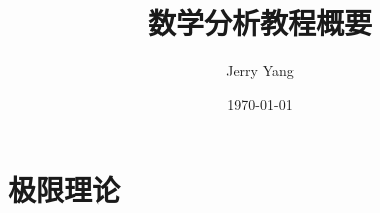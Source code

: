 \documentclass[UTF8, a4paper, oneside]{scrbook}
\title{数学分析教程概要}
\author{Jerry Yang}
\date{\today}
\begin{document}
\maketitle
\frontmatter
\tableofcontents
\mainmatter
\part{极限理论}





\backmatter
\end{document}
